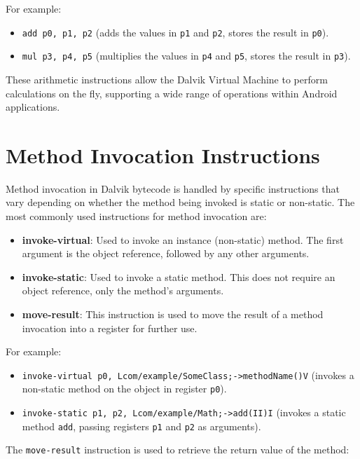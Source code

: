 \documentclass{article}
\begin{document}
For example:

\begin{itemize}
    \item \texttt{add p0, p1, p2} (adds the values in \texttt{p1} and \texttt{p2}, stores the result in \texttt{p0}).
    \item \texttt{mul p3, p4, p5} (multiplies the values in \texttt{p4} and \texttt{p5}, stores the result in \texttt{p3}).
\end{itemize}

These arithmetic instructions allow the Dalvik Virtual Machine to perform calculations on the fly, supporting a wide range of operations within Android applications.

\section{Method Invocation Instructions}
Method invocation in Dalvik bytecode is handled by specific instructions that vary depending on whether the method being invoked is static or non-static. The most commonly used instructions for method invocation are:

\begin{itemize}
    \item \textbf{invoke-virtual}: Used to invoke an instance (non-static) method. The first argument is the object reference, followed by any other arguments.
    \item \textbf{invoke-static}: Used to invoke a static method. This does not require an object reference, only the method's arguments.
    \item \textbf{move-result}: This instruction is used to move the result of a method invocation into a register for further use.
\end{itemize}

For example:

\begin{itemize}
    \item \texttt{invoke-virtual {p0}, Lcom/example/SomeClass;->methodName()V} (invokes a non-static method on the object in register \texttt{p0}).
    \item \texttt{invoke-static {p1, p2}, Lcom/example/Math;->add(II)I} (invokes a static method \texttt{add}, passing registers \texttt{p1} and \texttt{p2} as arguments).
\end{itemize}

The \texttt{move-result} instruction is used to retrieve the return value of the method:
\end{document}
